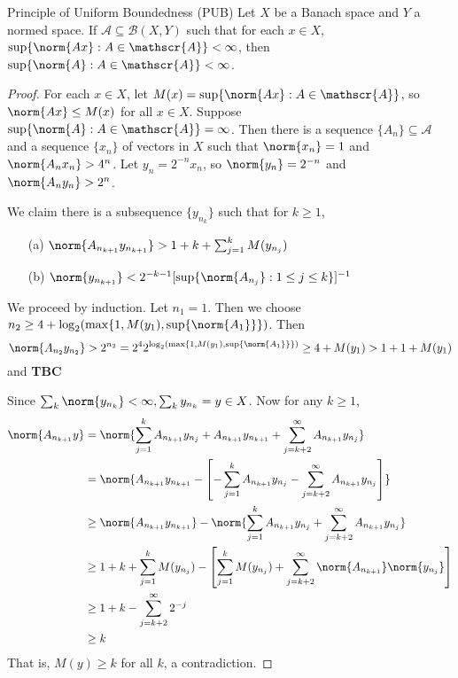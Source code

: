 \begin{nthm}{Principle of Uniform Boundedness (PUB)}
    Let $X$ be a Banach space and $Y$ a normed space. If $\mathscr{A} \subseteq \mathscr{B}(X,Y)$ such that for each $x \in X$, $\sup\{\norm{Ax}:A\in\mathscr{A}\} < \infty$, then $\sup\{\norm{A}:A\in\mathscr{A}\} < \infty$.
\end{nthm}
\begin{proof}
    For each $x \in X$, let $M(x) = \sup\{\norm{Ax}:A\in \mathscr{A}\}$, so $\norm{Ax} \leq M(x)$ for all $x \in X$. Suppose $\sup\{\norm{A}:A\in\mathscr{A}\} = \infty$. Then there is a sequence $\{A_n\}\subseteq \mathscr{A}$ and a sequence $\{x_n\}$ of vectors in $X$ such that $\norm{x_n} = 1$ and $\norm{A_nx_n} > 4^n$. Let $y_n = 2^{-n}x_n$, so $\norm{y_n} = 2^{-n}$ and $\norm{A_ny_n} > 2^n$.

    We claim there is a subsequence $\{y_{n_k}\}$ such that for $k \geq 1$, \begin{enumerate}
        \item[(a)] $\norm{A_{n_{k+1}}y_{n_{k+1}}} > 1 + k + \sum_{j=1}^kM(y_{n_j})$
        \item[(b)] $\norm{y_{n_{k+1}}} < 2^{-k-1}[\sup\{\norm{A_{n_j}}:1\leq j \leq k\}]^{-1}$
    \end{enumerate}
    We proceed by induction. Let $n_1 = 1$. Then we choose $n_2\geq 4+\log_2(\max\{1,M(y_1),\sup\{\norm{A_1}\}\})$. Then $$\norm{A_{n_2}y_{n_2}} > 2^{n_2} = 2^42^{\log_2(\max\{1,M(y_1),\sup\{\norm{A_1}\}\})} \geq 4+M(y_1) > 1+1+M(y_1)$$
    and \textbf{TBC}

    Since $\sum_k\norm{y_{n_k}} <\infty, \sum_ky_{n_k} = y \in X$. Now for any $k \geq 1$, \begin{align*}
        \norm{A_{n_{k+1}}y} &= \norm{\sum_{j=1}^kA_{n_{k+1}}y_{n_j}+A_{n_{k+1}}y_{n_{k+1}}+\sum_{j=k+2}^{\infty}A_{n_{k+1}}y_{n_j}} \\
        &= \norm{A_{n_{k+1}}y_{n_{k+1}}-\left[-\sum_{j=1}^kA_{n_{k+1}}y_{n_j}-\sum_{j=k+2}^{\infty}A_{n_{k+1}}y_{n_j}\right]} \\
        &\geq \norm{A_{n_{k+1}}y_{n_{k+1}}} - \norm{\sum_{j=1}^kA_{n_{k+1}}y_{n_j}+\sum_{j=k+2}^{\infty}A_{n_{k+1}}y_{n_j}} \\
        &\geq 1+k+\sum_{j=1}^kM(y_{n_j})-\left[\sum_{j=1}^kM(y_{n_j})+\sum_{j=k+2}^{\infty}\norm{A_{n_{k+1}}}\norm{y_{n_j}}\right] \\
        &\geq 1+k-\sum_{j=k+2}^{\infty}2^{-j} \\
        &\geq k
    \end{align*}
    That is, $M(y) \geq k$ for all $k$, a contradiction.
\end{proof}


